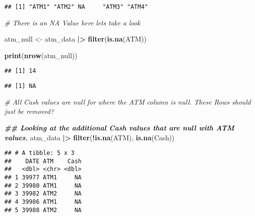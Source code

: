 \documentclass[
]{article}
\newenvironment{Shaded}{\begin{snugshade}}{\end{snugshade}}
\newcommand{\CommentTok}[1]{\textcolor[rgb]{0.56,0.35,0.01}{\textit{#1}}}
\newcommand{\DocumentationTok}[1]{\textcolor[rgb]{0.56,0.35,0.01}{\textbf{\textit{#1}}}}
\newcommand{\FunctionTok}[1]{\textcolor[rgb]{0.13,0.29,0.53}{\textbf{#1}}}
\newcommand{\NormalTok}[1]{#1}
\newcommand{\OtherTok}[1]{\textcolor[rgb]{0.56,0.35,0.01}{#1}}
\newcommand{\SpecialCharTok}[1]{\textcolor[rgb]{0.81,0.36,0.00}{\textbf{#1}}}
\begin{document}
\begin{verbatim}
## [1] "ATM1" "ATM2" NA     "ATM3" "ATM4"
\end{verbatim}

\begin{Shaded}
\begin{Highlighting}[]
\CommentTok{\# There is an \textquotesingle{}NA\textquotesingle{} Value here lets take a look}

\NormalTok{atm\_null }\OtherTok{\textless{}{-}}\NormalTok{ atm\_data }\SpecialCharTok{|\textgreater{}} \FunctionTok{filter}\NormalTok{(}\FunctionTok{is.na}\NormalTok{(ATM))}

\FunctionTok{print}\NormalTok{(}\FunctionTok{nrow}\NormalTok{(atm\_null))}
\end{Highlighting}
\end{Shaded}

\begin{verbatim}
## [1] 14
\end{verbatim}

\begin{Shaded}
\end{Shaded}

\begin{verbatim}
## [1] NA
\end{verbatim}

\begin{Shaded}
\begin{Highlighting}[]
\CommentTok{\# All Cash values are null for where the ATM column is null. These Rows should just be removed? }

\DocumentationTok{\#\# Looking at the additional Cash values that are null with ATM values.}
\NormalTok{atm\_data }\SpecialCharTok{|\textgreater{}} \FunctionTok{filter}\NormalTok{(}\SpecialCharTok{!}\FunctionTok{is.na}\NormalTok{(ATM), }\FunctionTok{is.na}\NormalTok{(Cash))}
\end{Highlighting}
\end{Shaded}

\begin{verbatim}
## # A tibble: 5 x 3
##    DATE ATM    Cash
##   <dbl> <chr> <dbl>
## 1 39977 ATM1     NA
## 2 39980 ATM1     NA
## 3 39982 ATM2     NA
## 4 39986 ATM1     NA
## 5 39988 ATM2     NA
\end{verbatim}
\end{document}
